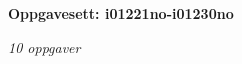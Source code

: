 \centerline{\bf Oppgavesett: i01221no-i01230no}
\vskip 10pt
\centerline{\it 10 oppgaver}\vskip 10pt
\vskip 10pt
